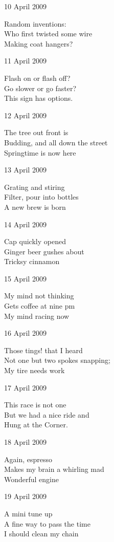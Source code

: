 \documentclass[12pt]{article}
\begin{document}
\newpage

10 April 2009

Random inventions: \\
Who first twisted some wire \\
Making coat hangers?

11 April 2009

Flash on or flash off? \\
Go slower or go faster? \\
This sign has options.

12 April 2009

The tree out front is  \\
Budding, and all down the street  \\
Springtime is now here

13 April 2009

Grating and stiring \\
Filter, pour into bottles \\
A new brew is born

14 April 2009

Cap quickly opened \\
Ginger beer gushes about \\
Tricksy cinnamon

15 April 2009

My mind not thinking \\
Gets coffee at nine pm \\
My mind racing now

16 April 2009

Those tings! that I heard \\
Not one but two spokes snapping; \\
My tire needs work

\newpage



\newpage

\newpage

17 April 2009

This race is not one \\
But we had a nice ride and \\
Hung at the Corner.

18 April 2009

Again, espresso \\
Makes my brain a whirling mad \\
Wonderful engine

19 April 2009

A mini tune up \\
A fine way to pass the time \\
I should clean my chain
\end{document}

